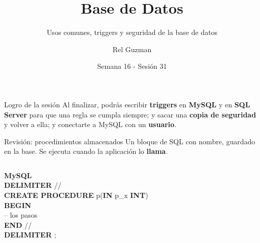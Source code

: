 \documentclass[aspectratio=169,10pt,c]{beamer}
\title{Base de Datos}
\subtitle{Usos comunes, triggers y seguridad de la base de datos}
\date{Semana 16 - Sesión 31}
\author{Rel Guzman}
\newcommand{\kw}[1]{\textcolor{utpRojo}{\textbf{#1}}}
\newcommand{\com}[1]{\textcolor{utpGrisMedio}{#1}}
\newcommand{\npieza}[1]{\tikz[baseline=-0.6ex]{\node[circle,fill=utpRojo,text=white,
  font=\bfseries\scriptsize,inner sep=1.6pt,minimum size=4.2mm] {#1};}}
\newenvironment{sqlmini}[1][.86\textwidth]
  {\begin{center}\begin{lrbox}{\sqlbuf}\begin{minipage}{#1}\ttfamily\fontsize{7}{8.3}\selectfont\vspace{4pt}\raggedright}
  {\vspace{4pt}\end{minipage}\end{lrbox}\colorbox{utpGrisClaro}{\usebox{\sqlbuf}}\end{center}}
\newcommand{\col}{\dimexpr\textwidth-2\fboxsep\relax}
\newcommand{\ind}{\hspace*{1.2em}}
\begin{document}
{\maketitle}
\begin{frame}[c]
\begin{block}{Logro de la sesión}
Al finalizar, podrás escribir \textbf{triggers} en \textbf{MySQL} y en \textbf{SQL Server} para que una regla se cumpla siempre; y sacar una \textbf{copia de seguridad} y volver a ella; y conectarte a MySQL con un \textbf{usuario}.
\end{block}
\end{frame}
\begin{frame}{Revisión: procedimientos almacenados}
\small Un bloque de SQL con nombre, guardado en la base. Se ejecuta cuando la aplicación lo \textbf{llama}.
\vspace{0.1cm}
\begin{center}
\end{center}
\vspace{-0.65cm}
\begin{columns}[T,onlytextwidth]
\begin{sqlmini}[\col]
{\normalfont\bfseries MySQL}\\[2pt]
\kw{DELIMITER} //\\
\kw{CREATE PROCEDURE} p(\kw{IN} p\_x \kw{INT})\\
\kw{BEGIN}\\
\ind\com{-- los pasos}\\
\kw{END} //\\
\kw{DELIMITER} ;\\[3pt]

\end{sqlmini}
\end{columns}
\end{frame}
\end{document}
